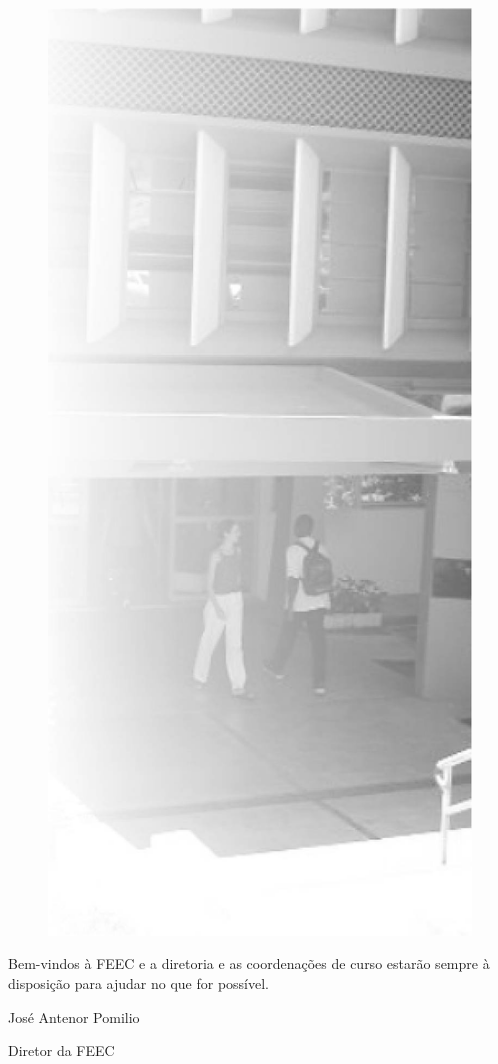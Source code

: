 \begin{figure}
    \includegraphics[width=.35\textwidth]{img/ola_mundo/feec.jpg}
\end{figure}

Bem-vindos à FEEC e a diretoria e as coordenações de curso estarão sempre à
disposição para ajudar no que for possível.

José Antenor Pomilio

Diretor da FEEC
